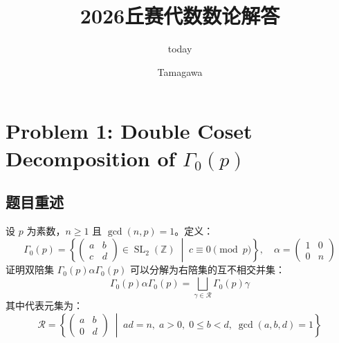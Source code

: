 \documentclass[]{article}
\title{2026丘赛代数数论解答}
\author{today}
\author{Tamagawa}
\begin{document}
	
\maketitle
	
	\section*{Problem 1: Double Coset Decomposition of $\Gamma_0(p)$}
	
	\subsection*{题目重述}
	设 $p$ 为素数，$n \ge 1$ 且 $\gcd(n,p)=1$。定义：
	\[ \Gamma_0(p) = \left\{ \begin{pmatrix} a & b \\ c & d \end{pmatrix} \in \operatorname{SL}_2(\mathbb{Z}) \;\middle|\; c \equiv 0 \pmod p \right\}, \quad \alpha = \begin{pmatrix} 1 & 0 \\ 0 & n \end{pmatrix} \]
	证明双陪集 $\Gamma_0(p)\alpha\Gamma_0(p)$ 可以分解为右陪集的互不相交并集：
	\[ \Gamma_0(p)\alpha\Gamma_0(p) = \bigsqcup_{\gamma \in \mathcal{R}} \Gamma_0(p)\gamma \]
	其中代表元集为：
	\[ \mathcal{R} = \left\{ \begin{pmatrix} a & b \\ 0 & d \end{pmatrix} \;\middle|\; ad=n, \; a>0, \; 0 \le b < d, \; \gcd(a,b,d)=1 \right\} \]
	
\end{document}
